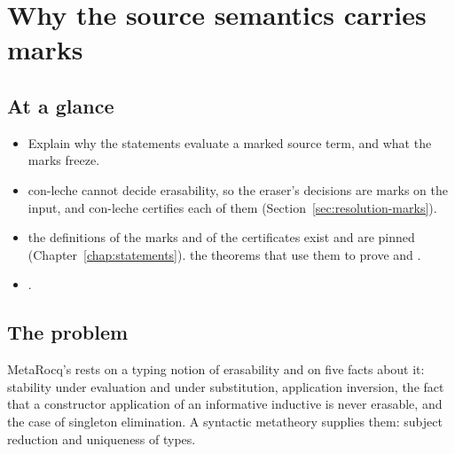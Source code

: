 \chapter{Why the source semantics carries marks}\label{chap:resolution}

\section*{At a glance}
\begin{itemize}
\item {} Explain why the statements evaluate a marked source term, and what the marks
  freeze.
\item {} con-leche cannot decide erasability, so the eraser's decisions are marks
  on the input, and con-leche certifies each of them (Section~\ref{sec:resolution-marks}).
\item {} \stProved{} the definitions of the marks and of the certificates exist and are
  pinned (Chapter~\ref{chap:statements}). \stOpen{} the theorems that use them to prove  and .
\item {} .
\end{itemize}

\section{The problem}\label{sec:resolution-problem}

MetaRocq's  rests on a typing notion of erasability and on five facts about it:
stability under evaluation and under substitution, application inversion, the fact that a
constructor application of an informative inductive is never erasable, and the case of singleton
elimination. A syntactic metatheory supplies them: subject reduction and uniqueness of types.

